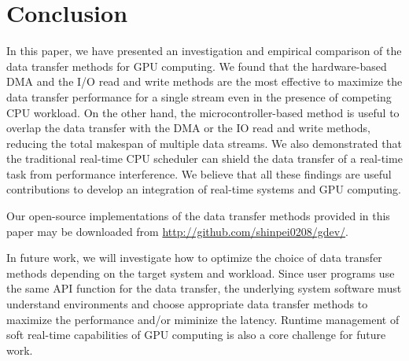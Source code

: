 \section{Conclusion}
\label{sec:conclusion}

In this paper, we have presented an investigation and empirical
comparison of the data transfer methods for GPU computing.
We found that the hardware-based DMA and the I/O read and write methods
are the most effective to maximize the data transfer performance for a
single stream even in the presence of competing CPU workload.
On the other hand, the microcontroller-based method is useful to overlap
the data transfer with the DMA or the IO read and write methods,
reducing the total makespan of multiple data streams.
We also demonstrated that the traditional real-time CPU scheduler can
shield the data transfer of a real-time task from performance
interference.
We believe that all these findings are useful contributions to develop
an integration of real-time systems and GPU computing.

Our open-source implementations of the data transfer methods
provided in this paper may be downloaded from
\url{http://github.com/shinpei0208/gdev/}.

In future work, we will investigate how to optimize the choice of data
transfer methods depending on the target system and workload.
Since user programs use the same API function for the data transfer, the
underlying system software must understand environments and choose
appropriate data transfer methods to maximize the performance and/or
miminize the latency.
Runtime management of soft real-time capabilities of GPU computing is
also a core challenge for future work.